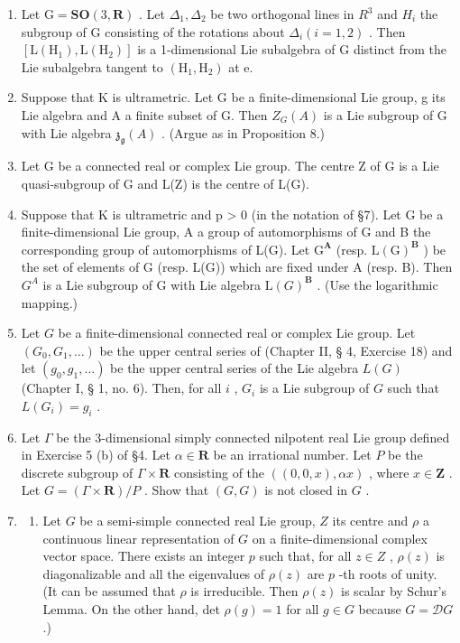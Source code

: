 
\begin{enumerate}
\def\labelenumi{\arabic{enumi}.}
\item
  Let \(\mathrm{G} = \mathbf{SO}(3, \mathbf{R})\) . Let \(\Delta_{1}, \Delta_{2}\) be two orthogonal lines in \(R^{3}\) and \(H_{i}\) the subgroup of G consisting of the rotations about \(\Delta_{i} (i = 1, 2)\) . Then \([\mathrm{L}(\mathrm{H}_{1}), \mathrm{L}(\mathrm{H}_{2})]\) is a 1-dimensional Lie subalgebra of G distinct from the Lie subalgebra tangent to \((\mathrm{H}_{1}, \mathrm{H}_{2})\) at e.
\item
  Suppose that K is ultrametric. Let G be a finite-dimensional Lie group, g its Lie algebra and A a finite subset of G. Then \(Z_{G}(A)\) is a Lie subgroup of G with Lie algebra \(\mathfrak{z}_{\mathfrak{g}}(A)\) . (Argue as in Proposition 8.)
\item
  Let G be a connected real or complex Lie group. The centre Z of G is a Lie quasi-subgroup of G and L(Z) is the centre of L(G).
\item
  Suppose that K is ultrametric and p \textgreater{} 0 (in the notation of §7). Let G be a finite-dimensional Lie group, A a group of automorphisms of G and B the corresponding group of automorphisms of L(G). Let \(\mathrm{G}^{\mathbf{A}}\) (resp. \(\mathrm{L}(\mathrm{G})^{\mathbf{B}}\) ) be the set of elements of G (resp. L(G)) which are fixed under A (resp. B). Then \(G^{A}\) is a Lie subgroup of G with Lie algebra \(\mathrm{L}(G)^{\mathbf{B}}\) . (Use the logarithmic mapping.)
\item
  Let \(G\) be a finite-dimensional connected real or complex Lie group. Let \((G_0, G_1, \ldots)\) be the upper central series of (Chapter II, § 4, Exercise 18) and let \((g_0, g_1, \ldots)\) be the upper central series of the Lie algebra \(L(G)\) (Chapter I, § 1, no. 6). Then, for all \(i\) , \(G_i\) is a Lie subgroup of \(G\) such that \(L(G_i) = g_i\) .
\item
  Let \(\Gamma\) be the 3-dimensional simply connected nilpotent real Lie group defined in Exercise 5 (b) of §4. Let \(\alpha \in \mathbf{R}\) be an irrational number. Let \(P\) be the discrete subgroup of \(\Gamma \times \mathbf{R}\) consisting of the \(((0,0,x),\alpha x)\) , where \(x \in \mathbf{Z}\) . Let \(G = (\Gamma \times \mathbf{R}) / P\) . Show that \((G,G)\) is not closed in \(G\) .
\item
  \begin{enumerate}
  \def\labelenumii{(\alph{enumii})}
  \tightlist
  \item
    Let \(G\) be a semi-simple connected real Lie group, \(Z\) its centre and \(\rho\) a continuous linear representation of \(G\) on a finite-dimensional complex vector space. There exists an integer \(p\) such that, for all \(z \in Z\) , \(\rho(z)\) is diagonalizable and all the eigenvalues of \(\rho(z)\) are \(p\) -th roots of unity. (It can be assumed that \(\rho\) is irreducible. Then \(\rho(z)\) is scalar by Schur's Lemma. On the other hand, det \(\rho(g) = 1\) for all \(g \in G\) because \(G = \mathcal{D}G\) .)
  \end{enumerate}
\end{enumerate}

